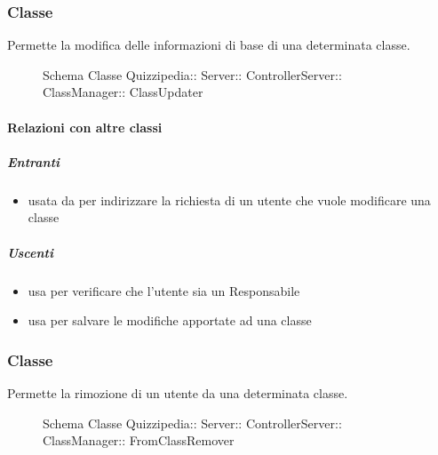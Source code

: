 \subsubsection{Classe }
Permette la modifica delle informazioni di base di una determinata classe.
\begin{figure}[H]
\centering
\noindent{}
\caption[Schema Classe ClassUpdater]{Schema Classe Quizzipedia:: Server:: ControllerServer:: ClassManager:: ClassUpdater}
\end{figure}
\paragraph{Relazioni con altre classi}
\subparagraph{Entranti}
\begin{itemize}
\item usata da  per indirizzare la richiesta di un utente che vuole modificare una classe
\end{itemize}
\subparagraph{Uscenti}
\begin{itemize}
\item usa  per verificare che l'utente sia un Responsabile
\item usa  per salvare le modifiche apportate ad una classe
\end{itemize}
\subsubsection{Classe }
Permette la rimozione di un utente da una determinata classe.
\begin{figure}[H]
\centering
\noindent{}
\caption[Schema Classe FromClassRemover]{Schema Classe Quizzipedia:: Server:: ControllerServer:: ClassManager:: FromClassRemover}
\end{figure}
